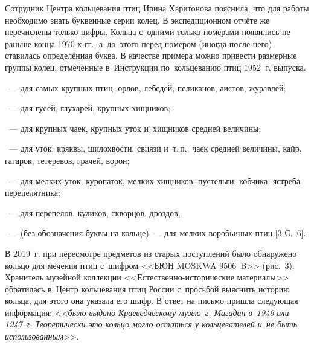 Сотрудник Центра кольцевания птиц Ирина Харитонова пояснила, что для работы необходимо знать буквенные серии колец. В экспедиционном отчёте же перечислены только цифры. Кольца с~одними только номерами появились не раньше конца 1970-х гг., а~до~этого перед номером (иногда после него) ставилась определённая буква. В качестве примера можно привести размерные группы колец, отмеченные в~Инструкции по~кольцеванию птиц 1952~г. выпуска.\enlargethispage{\baselineskip}
\begin{description}[noitemsep]\vspace{-10pt}
\item[Серия <<А>>]~--- для самых крупных птиц: орлов, лебедей, пеликанов, аистов, журавлей;
\item[Серия <<В>>]~--- для гусей, глухарей, крупных хищников;
\item[Серия <<С>>]~--- для крупных чаек, крупных уток и~хищников средней величины;
\item[Серия <<D>>]~--- для уток: кряквы, шилохвости, свиязи и~т.\,п., чаек средней величины, кайр, гагарок, тетеревов, грачей, ворон;
\item[Серия <<Е>>]~--- для мелких уток, куропаток, мелких хищников: пустельги, кобчика, ястреба-перепелятника;

\item[Серия <<F>>]~--- для перепелов, куликов, скворцов, дроздов;
\item[Серия <<G>>]~--- (без обозначения буквы на кольце)~--- для мелких воробьиных птиц [3 С.~6].\enlargethispage{2\baselineskip}
\end{description}\vspace{-8pt}




В 2019~г. при пересмотре предметов из старых поступлений было обнаружено кольцо для мечения птиц с~шифром <<БЮН MOSKWA 9506~B>> (рис.~3). Хранитель музейной коллекции <<Естественно-исторические материалы>> обратилась в~Центр кольцевания птиц России с~просьбой выяснить историю кольца, для этого она указала его шифр. В ответ на письмо пришла следующая информация: <<\textit{ было выдано Краеведческому музею~г. Магадан в~1946 или 1947~г. Теоретически это кольцо могло остаться у кольцевателей и~не быть использованным}>>.



